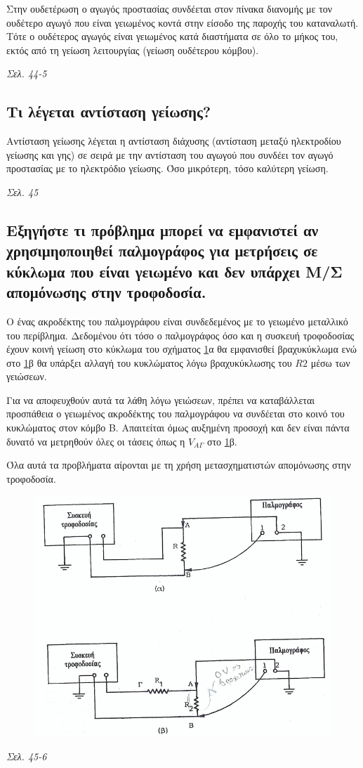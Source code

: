 \documentclass{article}
\begin{document}
Στην ουδετέρωση ο αγωγός προστασίας συνδέεται στον πίνακα διανομής με τον ουδέτερο αγωγό που είναι γειωμένος κοντά στην είσοδο της παροχής του καταναλωτή. Τότε ο ουδέτερος
αγωγός είναι γειωμένος κατά διαστήματα σε όλο το μήκος του, εκτός από τη γείωση λειτουργίας (γείωση ουδέτερου κόμβου).

\emph{Σελ. 44-5}

\subsection{Τι λέγεται αντίσταση γείωσης?}
Αντίσταση γείωσης λέγεται η αντίσταση διάχυσης (αντίσταση μεταξύ ηλεκτροδίου γείωσης και γης) σε σειρά με την αντίσταση του αγωγού που συνδέει τον αγωγό προστασίας με 
το ηλεκτρόδιο γείωσης. Όσο μικρότερη, τόσο καλύτερη γείωση.

\emph{Σελ. 45}

\subsection{Εξηγήστε τι πρόβλημα μπορεί να εμφανιστεί αν χρησιμηοποιηθεί παλμογράφος για μετρήσεις σε κύκλωμα που είναι γειωμένο και δεν υπάρχει Μ/Σ απομόνωσης στην
τροφοδοσία.}
Ο ένας ακροδέκτης του παλμογράφου είναι συνδεδεμένος με το γειωμένο μεταλλικό του περίβλημα. Δεδομένου ότι τόσο ο παλμογράφος όσο και η συσκευή τροφοδοσίας έχουν κοινή
γείωση στο κύκλωμα του σχήματος \ref{erwtisi64}α θα εμφανισθεί βραχυκύκλωμα ενώ στο \ref{erwtisi64}β θα υπάρξει αλλαγή του κυκλώματος λόγω βραχυκύκλωσης του $R2$ μέσω 
των γειώσεων.

Για να αποφευχθούν αυτά τα λάθη λόγω γειώσεων, πρέπει να καταβάλλεται προσπάθεια ο γειωμένος ακροδέκτης του παλμογράφου να συνδέεται στο κοινό του κυκλώματος στον κόμβο
Β. Απαιτείται όμως αυξημένη προσοχή και δεν είναι πάντα δυνατό να μετρηθούν όλες οι τάσεις όπως η $V_{A\Gamma}$ στο \ref{erwtisi64}β.

Όλα αυτά τα προβλήματα αίρονται με τη χρήση μετασχηματιστών απομόνωσης στην τροφοδοσία.

\begin{figure}[h!]
    \includegraphics[width=\linewidth]{erwtisi64.png}
    \caption{}
    \label{erwtisi64}
\end{figure}
\emph{Σελ. 45-6}
\end{document}

